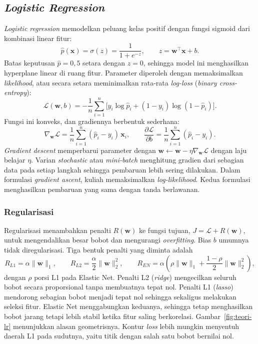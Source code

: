 \subsection{\textit{Logistic Regression}}
\textit{Logistic regression} memodelkan peluang kelas positif dengan fungsi sigmoid dari kombinasi linear fitur:
\begin{equation}
    \hat{p}(\mathbf{x})=\sigma(z)=\frac{1}{1+e^{-z}},\qquad z=\mathbf{w}^\top\mathbf{x}+b.
    \label{eq:sigmoid}
\end{equation}
Batas keputusan $\hat{p}=0{,}5$ setara dengan $z=0$, sehingga model ini menghasilkan hyperplane linear di ruang fitur. Parameter diperoleh dengan memaksimalkan \textit{likelihood}, atau secara setara meminimalkan rata-rata \textit{log-loss} (\textit{binary cross-entropy}):
\begin{equation}
    \mathcal{L}(\mathbf{w},b)=-\frac{1}{n}\sum_{i=1}^{n}\Big[y_i\log\hat{p}_i+(1-y_i)\log(1-\hat{p}_i)\Big].
    \label{eq:logloss}
\end{equation}
Fungsi ini konveks, dan gradiennya berbentuk sederhana:
\begin{equation}
    \nabla_{\mathbf{w}}\mathcal{L}=\frac{1}{n}\sum_{i=1}^{n}(\hat{p}_i-y_i)\,\mathbf{x}_i,\qquad
    \frac{\partial\mathcal{L}}{\partial b}=\frac{1}{n}\sum_{i=1}^{n}(\hat{p}_i-y_i).
    \label{eq:lr-grad}
\end{equation}
\textit{Gradient descent} memperbarui parameter dengan $\mathbf{w}\leftarrow\mathbf{w}-\eta\nabla_{\mathbf{w}}\mathcal{L}$ dengan laju belajar $\eta$. Varian \textit{stochastic} atau \textit{mini-batch} menghitung gradien dari sebagian data pada setiap langkah sehingga pembaruan lebih sering dilakukan. Dalam formulasi \textit{gradient ascent}, kuliah memaksimalkan \textit{log-likelihood}. Kedua formulasi menghasilkan pembaruan yang sama dengan tanda berlawanan.

\subsubsection{Regularisasi}
Regularisasi menambahkan penalti $R(\mathbf{w})$ ke fungsi tujuan, $J=\mathcal{L}+R(\mathbf{w})$, untuk mengendalikan besar bobot dan mengurangi \textit{overfitting}. Bias $b$ umumnya tidak diregularisasi. Tiga bentuk penalti yang diminta adalah
\begin{equation}
    R_{L1}=\alpha\|\mathbf{w}\|_1,\qquad
    R_{L2}=\frac{\alpha}{2}\|\mathbf{w}\|_2^2,\qquad
    R_{EN}=\alpha\left(\rho\|\mathbf{w}\|_1+\frac{1-\rho}{2}\|\mathbf{w}\|_2^2\right),
    \label{eq:reg}
\end{equation}
dengan $\rho$ porsi L1 pada Elastic Net. Penalti L2 (\textit{ridge}) mengecilkan seluruh bobot secara proporsional tanpa membuatnya tepat nol. Penalti L1 (\textit{lasso}) mendorong sebagian bobot menjadi tepat nol sehingga sekaligus melakukan seleksi fitur. Elastic Net menggabungkan keduanya, sehingga tetap menghasilkan bobot jarang tetapi lebih stabil ketika fitur saling berkorelasi. Gambar~\ref{fig:teori-lr} menunjukkan alasan geometrisnya. Kontur \textit{loss} lebih mungkin menyentuh daerah L1 pada sudutnya, yaitu titik dengan salah satu bobot bernilai nol.

